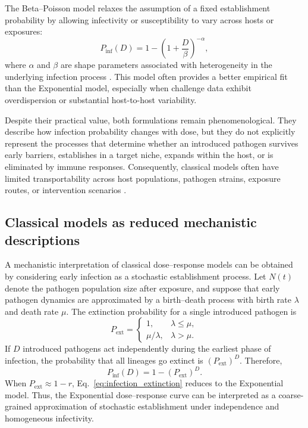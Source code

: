 \documentclass[11pt]{article}
\begin{document}
The Beta--Poisson model relaxes the assumption of a fixed establishment probability by allowing infectivity or susceptibility to vary across hosts or exposures:
\begin{equation}
P_{\mathrm{inf}}(D) =
1 - \left(1+\frac{D}{\beta}\right)^{-\alpha},
\label{eq:betapoisson}
\end{equation}
where $\alpha$ and $\beta$ are shape parameters associated with heterogeneity in the underlying infection process \cite{Haas2014QMRA,Moore2020InoculumImmune}. This model often provides a better empirical fit than the Exponential model, especially when challenge data exhibit overdispersion or substantial host-to-host variability.

Despite their practical value, both formulations remain phenomenological. They describe how infection probability changes with dose, but they do not explicitly represent the processes that determine whether an introduced pathogen survives early barriers, establishes in a target niche, expands within the host, or is eliminated by immune responses. Consequently, classical models often have limited transportability across host populations, pathogen strains, exposure routes, or intervention scenarios \cite{Haas2014QMRA,Levin2001WithinHost,Rahman2018AdvancingRiskAssessment}.

\subsection{Classical models as reduced mechanistic descriptions}
\label{stochastic} %
A mechanistic interpretation of classical dose--response models can be obtained by considering early infection as a stochastic establishment process. Let $N(t)$ denote the pathogen population size after exposure, and suppose that early pathogen dynamics are approximated by a birth--death process with birth rate $\lambda$ and death rate $\mu$. The extinction probability for a single introduced pathogen is
\begin{equation}
P_{\mathrm{ext}} =
\begin{cases}
1, & \lambda \leq \mu,\\[4pt]
\mu/\lambda, & \lambda > \mu.
\end{cases}
\label{eq:extinction}
\end{equation}
If $D$ introduced pathogens act independently during the earliest phase of infection, the probability that all lineages go extinct is $(P_{\mathrm{ext}})^D$. Therefore,
\begin{equation}
P_{\mathrm{inf}}(D) = 1 - \left(P_{\mathrm{ext}}\right)^D .
\label{eq:infection_extinction}
\end{equation}
When $P_{\mathrm{ext}}\approx 1-r$, Eq.~\eqref{eq:infection_extinction} reduces to the Exponential model. Thus, the Exponential dose--response curve can be interpreted as a coarse-grained approximation of stochastic establishment under independence and homogeneous infectivity.
\end{document}
